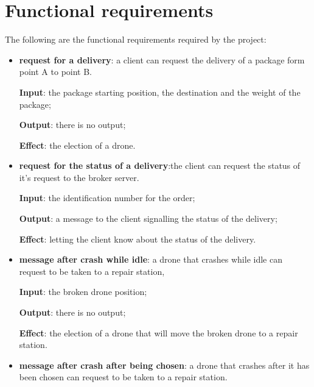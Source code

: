 \documentclass[a4paper, oneside]{memoir}
\begin{document}
\section{Functional requirements}


The following are the functional requirements required by the project:
\begin{itemize}
\item \textbf{request for a delivery}: a client can request the delivery of a package form point A to point B.

	\textbf{Input}: the package starting position, the destination and the weight of the package;

	\textbf{Output}: there is no output;

	\textbf{Effect}: the election of a drone.

\item \textbf{request for the status of a delivery}:the client can request the status of it's request to the broker server.

 	\textbf{Input}: the identification number for the order;

	\textbf{Output}: a message to the client signalling the status of the delivery;

	\textbf{Effect}: letting the client know about the status of the delivery.

\item \textbf{message after crash while idle}: a drone that crashes while idle can request to be taken to a repair station,

	\textbf{Input}: the broken drone position;

	\textbf{Output}: there is no output;

	\textbf{Effect}: the election of a drone that will move the broken drone to a repair station.

\item \textbf{message after crash after being chosen}: a drone that crashes after it has been chosen can request to be taken to a repair station.


\end{itemize}
\end{document}
